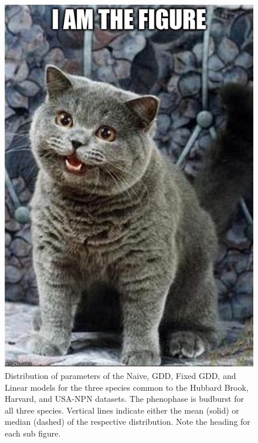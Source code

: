 \begin{figure}
	\centering
	\includegraphics[scale=0.5]{images/figure_filler.jpg}
	\caption[Distribution of parameters of the Naive, GDD, Fixed GDD, and Linear models for the three species common to the Hubbard Brook, Harvard, and USA-NPN datasets]{Distribution of parameters of the Naive, GDD, Fixed GDD, and Linear models for the three species common to the Hubbard Brook, Harvard, and USA-NPN datasets. The phenophase is budburst for all three species. Vertical lines indicate either the mean (solid) or median (dashed) of the respective distribution. Note the heading for each sub figure. } \label{fig-a-8}
\end{figure}

\newpage

